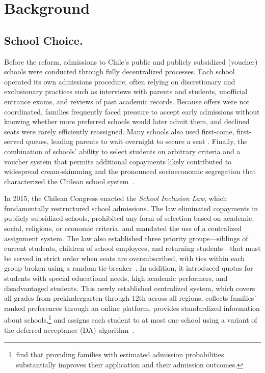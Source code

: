 \section{Background}\label{sec:background}

\subsection{School Choice.}

Before the reform, admissions to Chile's public and publicly subsidized (voucher) schools were conducted through fully decentralized processes. Each school operated its own admissions procedure, often relying on discretionary and exclusionary practices such as interviews with parents and students, unofficial entrance exams, and reviews of past academic records. Because offers were not coordinated, families frequently faced pressure to accept early admissions without knowing whether more preferred schools would later admit them, and declined seats were rarely efficiently reassigned. Many schools also used first-come, first-served queues, leading parents to wait overnight to secure a seat \citep{correa2021}. Finally, the combination of schools' ability to select students on arbitrary criteria and a voucher system that permits additional copayments likely contributed to widespread cream‑skimming and the pronounced socioeconomic segregation that characterized the Chilean school system~\citep{gazmuri2024}. 

In 2015, the Chilean Congress enacted the \emph{School Inclusion Law}, which fundamentally restructured school admissions. The law eliminated copayments in publicly subsidized schools, prohibited any form of selection based on academic, social, religious, or economic criteria, and mandated the use of a centralized assignment system. The law also established three priority groups—siblings of current students, children of school employees, and returning students—that must be served in strict order when seats are oversubscribed, with ties within each group broken using a random tie-breaker~\citep{correa2021}. In addition, it introduced quotas for students with special educational needs, high academic performers, and disadvantaged students.
This newly established centralized system, which covers all grades from prekindergarten through 12th across all regions, collects families' ranked preferences through an online platform, provides standardized information about schools,\footnote{\cite{arteaga2022smart} find that providing families with estimated admission probabilities substantially improves their application and their admission outcomes.} and assigns each student to at most one school using a variant of the deferred acceptance (DA) algorithm~\citep{correa2021}. 


